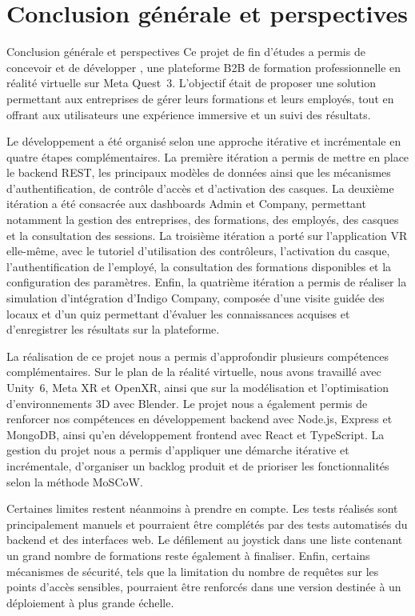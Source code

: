 \chapter*{Conclusion générale et perspectives}
         {Conclusion générale et perspectives}
Ce projet de fin d'études a permis de concevoir et de développer \tynassit{},
une plateforme B2B de formation professionnelle en réalité virtuelle sur Meta
Quest~3. L'objectif était de proposer une solution permettant aux entreprises
de gérer leurs formations et leurs employés, tout en offrant aux utilisateurs
une expérience immersive et un suivi des résultats.

Le développement a été organisé selon une approche itérative et incrémentale en
quatre étapes complémentaires. La première itération a permis de mettre en place
le backend REST, les principaux modèles de données ainsi que les mécanismes
d'authentification, de contrôle d'accès et d'activation des casques. La deuxième
itération a été consacrée aux dashboards Admin et Company, permettant notamment
la gestion des entreprises, des formations, des employés, des casques et la
consultation des sessions. La troisième itération a porté sur l'application VR
elle-même, avec le tutoriel d'utilisation des contrôleurs, l'activation du casque,
l'authentification de l'employé, la consultation des formations disponibles et
la configuration des paramètres. Enfin, la quatrième itération a permis de
réaliser la simulation d'intégration d'Indigo Company, composée d'une visite
guidée des locaux et d'un quiz permettant d'évaluer les connaissances acquises
et d'enregistrer les résultats sur la plateforme.

La réalisation de ce projet nous a permis d'approfondir plusieurs compétences
complémentaires. Sur le plan de la réalité virtuelle, nous avons travaillé avec
Unity~6, Meta XR et OpenXR, ainsi que sur la modélisation et l'optimisation
d'environnements 3D avec Blender. Le projet nous a également permis de renforcer
nos compétences en développement backend avec Node.js, Express et MongoDB,
ainsi qu'en développement frontend avec React et TypeScript. La gestion du
projet nous a permis d'appliquer une démarche itérative et incrémentale,
d'organiser un backlog produit et de prioriser les fonctionnalités selon la
méthode MoSCoW.

Certaines limites restent néanmoins à prendre en compte. Les tests réalisés sont
principalement manuels et pourraient être complétés par des tests automatisés
du backend et des interfaces web. Le défilement au joystick dans une liste
contenant un grand nombre de formations reste également à finaliser. Enfin, certains
mécanismes de sécurité, tels que la limitation du nombre de requêtes sur les
points d'accès sensibles, pourraient être renforcés dans une version destinée à
un déploiement à plus grande échelle.


